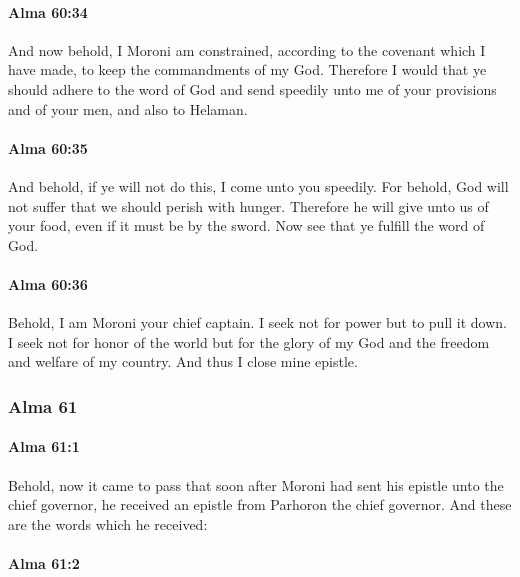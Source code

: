 		\paragraph{Alma 60:34} %
			\label{ALMA-60-34}

			And now behold, I Moroni am constrained,
			according to the covenant which I have made,
			to keep the commandments of my God.
			Therefore I would that ye should adhere to the word of God
			and send speedily unto me of your provisions and of your men,
			and also to Helaman.

		\paragraph{Alma 60:35} %
			\label{ALMA-60-35}

			And behold, if ye will not do this,
			I come unto you speedily.
			For behold, God will not suffer that we should perish with hunger.
			Therefore he will give unto us of your food,
			even if it must be by the sword.
			Now see that ye fulfill the word of God.

		\paragraph{Alma 60:36} %
			\label{ALMA-60-36}

			Behold, I am Moroni your chief captain.
			I seek not for power but to pull it down.
			I seek not for honor of the world
			but for the glory of my God and the freedom and welfare of my country.
			And thus I close mine epistle.

	\subsubsection{Alma 61} %
		\label{ALMA-61}
		
		\paragraph{Alma 61:1} %
			\label{ALMA-61-1}

			Behold, now it came to pass that
			soon after Moroni had sent his epistle unto the chief governor,
			he received an epistle from Parhoron the chief governor.
			And these are the words which he received:

		\paragraph{Alma 61:2} %
			\label{ALMA-61-2}

